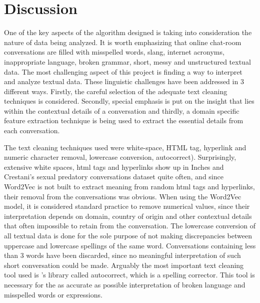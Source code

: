 \documentclass[11pt]{article}
\begin{document}
\section{Discussion}
One of the key aspects of the algorithm designed is taking into consideration the nature of data being analyzed. It is worth emphasizing that online chat-room conversations are filled with misspelled words, slang, internet acronyms, inappropriate language, broken grammar, short, messy and unstructured textual data. The most challenging aspect of this project is finding a way to interpret and analyze textual data. These linguistic challenges have been addressed in 3 different ways. Firstly, the careful selection of the adequate text cleaning techniques is considered. Secondly, special emphasis is put on the insight that lies within the contextual details of a conversation and thirdly, a domain specific feature extraction technique is being used to extract the essential details from each conversation.

The text cleaning techniques used were white-space, HTML tag, hyperlink and numeric character removal, lowercase conversion, autocorrect). Surprisingly, extensive white spaces, html tags and hyperlinks show up in Inches and Crestani's sexual predatory conversations dataset quite often, and since Word2Vec is not built to extract meaning from random html tags and hyperlinks, their removal from the conversations was obvious. When using the Word2Vec model, it is considered standard practice to remove numerical values, since their interpretation depends on domain, country of origin and other contextual details that often impossible to retain from the conversation. The lowercase conversion of all textual data is done for the sole purpose of not making discrepancies between uppercase and lowercase spellings of the same word. Conversations containing less than 3 words have been discarded, since no meaningful interpretation of such short conversation could be made. Arguably the most important text cleaning tool used is \cite{mccallum_2016}'s library called autocorrect, which is a spelling corrector. This tool is necessary for the as accurate as possible interpretation of broken language and misspelled words or expressions.
\end{document}
